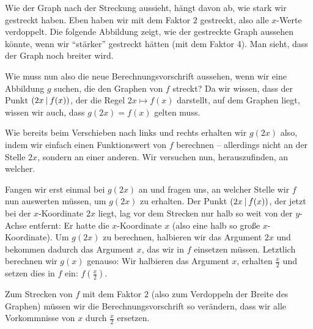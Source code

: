 \documentclass[../../main.tex]{subfiles}
\begin{document}
\begin{example}
    Wie der Graph nach der Streckung aussieht, hängt davon ab, wie stark wir gestreckt haben. Eben haben wir mit dem Faktor $2$ gestreckt, also alle $x$-Werte verdoppelt. Die folgende Abbildung zeigt, wie der gestreckte Graph aussehen könnte, wenn wir \enquote{stärker} gestreckt hätten (mit dem Faktor 4). Man sieht, dass der Graph noch breiter wird.

    \begin{center}
    \end{center}
\end{example}

Wie muss nun also die neue Berechnungsvorschrift aussehen, wenn wir eine Abbildung $g$ suchen, die den Graphen von $f$ streckt? Da wir wissen, dass der Punkt $\left(2x \:\middle|\: f(x)\right)$, der die Regel $2x\mapsto f(x)$ darstellt, auf dem Graphen liegt, wissen wir auch, dass $g(2x)=f(x)$ gelten muss. 

Wie bereits beim Verschieben nach links und rechts erhalten wir $g(2x)$ also, indem wir einfach einen Funktionswert von $f$ berechnen -- allerdings nicht an der Stelle $2x$, sondern an einer anderen. Wir versuchen nun, herauszufinden, an welcher.

Fangen wir erst einmal bei $g(2x)$ an und fragen uns, an welcher Stelle wir $f$ nun auswerten müssen, um $g(2x)$ zu erhalten. Der Punkt $\left(2x \:\middle|\: f(x)\right)$, der jetzt bei der $x$-Koordinate $2x$ liegt, lag vor dem Strecken nur halb so weit von der $y$-Achse entfernt: Er hatte die $x$-Koordinate $x$ (also eine halb so große $x$-Koordinate). Um $g(2x)$ zu berechnen, halbieren wir das Argument $2x$ und bekommen dadurch das Argument $x$, das wir in $f$ einsetzen müssen. Letztlich berechnen wir $g(x)$ genauso: Wir halbieren das Argument $x$, erhalten $\frac{x}{2}$ und setzen dies in $f$ ein: $f(\frac{x}{2})$.

Zum Strecken von $f$ mit dem Faktor $2$ (also zum Verdoppeln der Breite des Graphen) müssen wir die Berechnungsvorschrift so verändern, dass wir alle Vorkommnisse von $x$ durch $\frac{x}{2}$ ersetzen.
\end{document}
